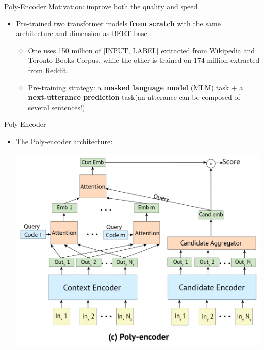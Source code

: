 \documentclass{beamer}
\begin{document}
\begin{frame}{Poly-Encoder}
    Motivation: improve both the quality and speed
    \begin{itemize}
        \item Pre-trained two transformer models \textbf{from scratch} with the same architecture and dimension as BERT-base. 
        \begin{itemize}
            \item One uses 150 million of [INPUT, LABEL] extracted from Wikipedia and Toronto Books Corpus, while the other is trained on 174 million extracted from Reddit. 
            \item Pre-training strategy: a \textbf{masked language model} (MLM) task + a \textbf{next-utterance prediction} task(an utterance can be composed of several sentences!)
        \end{itemize}
        
       
    \end{itemize}
\end{frame}

\begin{frame}{Poly-Encoder}
    \begin{itemize}
        \item The Poly-encoder architecture:
        \begin{center}
            \includegraphics[width=0.9\linewidth]{poly-encoder.png}
        \end{center}
       
    \end{itemize}
\end{frame}
\end{document}

